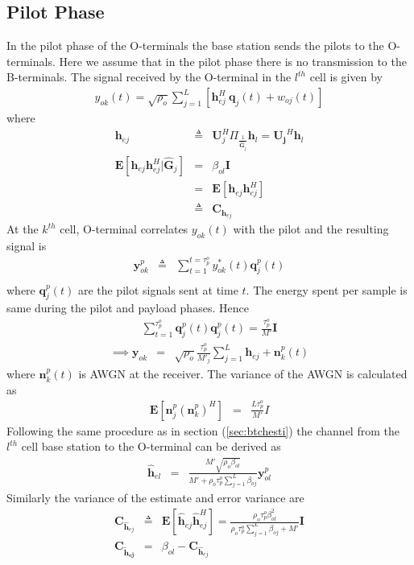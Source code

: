\documentclass[10pt, a4paper, twoside,fleqn]{article}
\begin{document}
\subsection{Pilot Phase}
	In the pilot phase of the O-terminals the base station sends the pilots to the O-terminals. Here we assume that in the pilot phase there is no transmission to the B-terminals.
The signal received by the O-terminal in the $l^{th}$ cell is given by
\begin{eqnarray}
	y_{ok}(t)=\sqrt{\rho_o} \sum_{j=1}^{L} \left[\pmb{h}^H_{ej} \ \pmb{q}_{j}(t) + w_{oj}(t) \right]
\end{eqnarray}
where
\begin{eqnarray}
	\pmb{h}_{ej} &\triangleq& \pmb{U}_j^H\Pi_{\frac{1}{\pmb{\hat G}_j}}\pmb{h}_l = \pmb{U_j}^H\pmb{h}_l \nonumber \\
    \pmb{E}[\pmb{h}_{ej}\pmb{h}^H_{ej}|\pmb{\hat G}_j] &=& \beta_{ol}\pmb{I} \nonumber \\
			                     &=& \pmb{E}[\pmb{h}_{ej}\pmb{h}^H_{ej}] \nonumber \\
                                           &\triangleq& \pmb{C}_{\pmb{h}_{ej}} \nonumber
\end{eqnarray}
At the $k^{th}$ cell, O-terminal correlates $y_{ok}(t)$ with the pilot and the resulting signal is
\begin{eqnarray}
	\pmb{y}_{ok}^{p} &\triangleq& \sum_{t=1}^{t=\tau_p^o} y_{ok}^*(t)\pmb{q}^{p}_{j}(t) \nonumber \\
\end{eqnarray}
where $\pmb{q}_j^p(t)$ are the pilot signals sent at time $t$. The energy spent per sample is same during the pilot and payload phases. Hence 
\begin{eqnarray}
    \sum\limits_{t=1}^{\tau_p^o}\pmb{q}^p_{j}(t)\pmb{q}^p_{j}(t)=\frac{\tau_p^o}{M'}\pmb{I}
\end{eqnarray}
\begin{eqnarray}
\implies \pmb{y}_{ok} &=& \sqrt{\rho_o}\frac{\tau_p^o}{M'_j}\sum_{j=1}^{L}\pmb{h}_{ej}+\pmb{n}^p_{k}(t)
\end{eqnarray}
where $\pmb{n}^p_{k}(t)$ is AWGN at the receiver. The variance of the AWGN is calculated as
\begin{eqnarray*}
	\pmb{E}[\pmb{n}^p_{j}(\pmb{n}^p_{k})^H] &=& \frac{L\tau_p^o}{M'}I 
\end{eqnarray*}
Following the same procedure as in section (\ref{sec:btchesti}) the channel from the $l^{th}$ cell base station to the O-terminal can be derived as 
\begin{eqnarray}\label{eqn:otchesti}
	\pmb{\hat h}_{el} &=& \frac{M'\sqrt{\rho_o\beta_{ol}}}{M'+\rho_o\tau_p^o\sum\limits_{j=1}^{L}\beta_{oj}}\pmb{y}^p_{ol}
\end{eqnarray}
Similarly the variance of the estimate and error variance are
\begin{eqnarray}
	\pmb{C}_{\pmb{\hat h}_{ej}} &\triangleq& \pmb{E}[\pmb{\hat h}_{ej}\pmb{\hat h}^H_{ej}] = \frac{\rho_o\tau_p^o\beta^2_{ol}}{\rho_o\tau_p^o\sum\limits_{j=1}^{L}\beta_{oj}+M'}\pmb{I} \\
	\pmb{C_{\widetilde{h}_{ej}}} &=& \beta_{ol} - 	\pmb{C}_{\pmb{\hat h}_{ej}}
\end{eqnarray}
\end{document}
